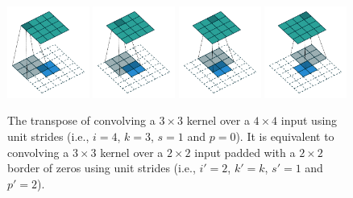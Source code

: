 \documentclass[notitlepage]{report}
\begin{document}
\begin{figure}[p]
    \centering
    \includegraphics[width=0.24\textwidth]{pdf/no_padding_no_strides_transposed_00.pdf}
    \includegraphics[width=0.24\textwidth]{pdf/no_padding_no_strides_transposed_01.pdf}
    \includegraphics[width=0.24\textwidth]{pdf/no_padding_no_strides_transposed_02.pdf}
    \includegraphics[width=0.24\textwidth]{pdf/no_padding_no_strides_transposed_03.pdf}
    \caption{\label{fig:no_padding_no_strides_transposed} The transpose of
        convolving a $3 \times 3$ kernel over a $4 \times 4$ input using unit
        strides (i.e., $i = 4$, $k = 3$, $s = 1$ and $p = 0$). It is equivalent
        to convolving a $3 \times 3$ kernel over a $2 \times 2$ input padded
        with a $2 \times 2$ border of zeros using unit strides (i.e., $i' = 2$,
        $k' = k$, $s' = 1$ and $p' = 2$).}
\end{figure}
\end{document}
